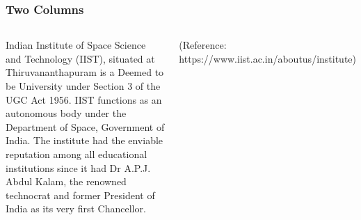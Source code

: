\documentclass[hyperref={bookmarks=false},aspectratio=169]{beamer}
\begin{document}
\begin{frame}
\frametitle{Two Columns}

\begin{columns}

Indian Institute of Space Science and Technology (IIST), situated at Thiruvananthapuram is a Deemed to be University under Section 3 of the UGC Act 1956. IIST functions as an autonomous body under the Department of Space, Government of India. 
The institute had the enviable reputation among all educational institutions since it had Dr A.P.J. Abdul Kalam, the renowned technocrat and former President of India as its very first Chancellor.

\small{(Reference: https://www.iist.ac.in/aboutus/institute)}

\end{columns}
\end{frame}
\end{document}
